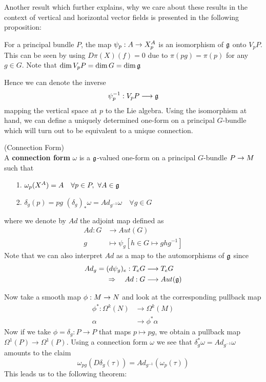 Another result which further explains, why we care about these results in the context of vertical and horizontal vector fields is presented in the following proposition:

\begin{prop}
 For a principal bundle $P$, the map $\psi_p : A \rightarrow X^A_p$ is an isomorphism of $\mathfrak{g}$ onto $V_pP$. This can be seen by using $D\pi(X)(f) = 0$ due to $\pi(pg) = \pi(p)$ for any $g\in G$. Note that $\dim V_pP = \dim G = \dim \mathfrak{g}$
\end{prop}

Hence we can denote the inverse
$$ \psi^{-1}_p: V_pP \longrightarrow \mathfrak{g} $$
mapping the vertical space at $p$ to the Lie algebra. Using the isomorphism at hand, we can define a uniquely determined one-form on a principal $G$-bundle which will turn out to be equivalent to a unique connection.

\begin{definition}
\label{Connection_Form}
(Connection Form)\\
  A \textbf{connection form} $\omega$ is a $\mathfrak{g}$-valued one-form on a principal $G$-bundle $P \rightarrow M$ such that
  \begin{itemize}
    \item[1.] $\omega_p(X^A) = A \quad \forall p \in P, \ \forall A \in \mathfrak{g}$
    \item[2.] $\delta_g (p) = pg$ \quad \quad $(\delta_g)_* \omega = Ad_{g^{-1}} \omega \quad \forall g \in G$
  \end{itemize}
  where we denote by $Ad$ the adjoint map defined as
  \begin{align*}
    Ad: G &\longrightarrow Aut(G)\\
    g &\longmapsto \psi_g [h \in G \longmapsto ghg^{-1}]
  \end{align*}
  Note that we can also interpret $Ad$ as a map to the automorphisms of $\mathfrak{g}$ since
  \begin{align*}
    Ad_g = (d\psi_g)_e : T_eG &\longrightarrow T_eG\\
    \Rightarrow \quad Ad: G &\longrightarrow Aut(\mathfrak{g})
  \end{align*}
\end{definition}

Now take a smooth map $\phi:M \ra N$ and look at the corresponding pullback map
\begin{align*}
  \phi^*: \Omega^k(N) &\longrightarrow \Omega^k(M)\\
  \alpha &\longrightarrow \phi^*\alpha
\end{align*}
Now if we take $\phi = \delta_g : P \longrightarrow P$ that maps $p \mapsto pg$, we obtain a pullback map $\Omega^1(P) \longrightarrow \Omega^1(P)$. Using a connection form $\omega$ we see that $\delta_g^* \omega = Ad_{g^{-1}}\omega$ amounts to the claim
$$\omega_{pg}(D\delta_g(\tau)) = Ad_{g^{-1}}(\omega_p(\tau))$$
This leads us to the following theorem:


